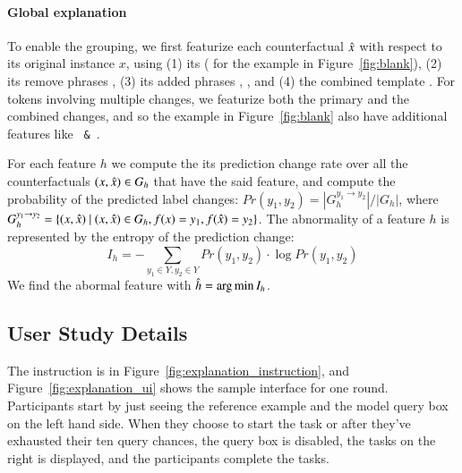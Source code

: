 \paragraph{Global explanation}
To enable the grouping, we first featurize each counterfactual $\hat{x}$ with respect to its original instance $x$, using 
(1) its \tagstr ( for the example in Figure~\ref{fig:blank}), 
(2) its remove phrases , 
(3) its added phrases , , and 
(4) the combined template .
For tokens involving multiple changes, we featurize both the primary and the combined changes, and so the example in Figure~\ref{fig:blank} also have additional features like \texttt{ \& }.

For each feature $h$ we compute the its prediction change rate over all the counterfactuals $(x, \hat{x}) \in G_{h}$ that have the said feature, and compute the probability of the predicted label changes: $Pr(y_1, y_2) = |G_h^{y_1\rightarrow y_2}|/|G_h|$, where $ G_h^{y_1\rightarrow y_2} = \{ (x, \xp)\ |\ (x, \xp) \in G_h, f(x)=y_1, f(\xp) = y_2 \}$.
The abnormality of a feature $h$ is represented by the entropy of the prediction change:
$$I_h = -\sum_{y_1 \in Y, y_2 \in Y} Pr(y_1, y_2) \cdot \log Pr(y_1, y_2)$$
We find the abormal feature with $\hat{h} = \operatorname*{arg\,min} I_h$.



\subsection{User Study Details}
\label{appendix:exp_user_study}

The instruction is in Figure~\ref{fig:explanation_instruction}, and Figure~\ref{fig:explanation_ui} shows the sample interface for one round. 
Participants start by just seeing the reference example and the model query box on the left hand side.
When they choose to start the task or after they've exhausted their ten query chances, the query box is disabled, the tasks on the right is displayed, and the participants complete the tasks.